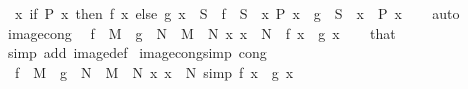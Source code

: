 \begin{isabellebody}
\ \ {\isachardoublequoteopen}{\isacharparenleft}{\kern0pt}{\isasymlambda}x{\isachardot}{\kern0pt}\ if\ P\ x\ then\ f\ x\ else\ g\ x{\isacharparenright}{\kern0pt}\ {\isacharbackquote}{\kern0pt}\ S\ {\isacharequal}{\kern0pt}\ f\ {\isacharbackquote}{\kern0pt}\ {\isacharparenleft}{\kern0pt}S\ {\isasyminter}\ {\isacharbraceleft}{\kern0pt}x{\isachardot}{\kern0pt}\ P\ x{\isacharbraceright}{\kern0pt}{\isacharparenright}{\kern0pt}\ {\isasymunion}\ g\ {\isacharbackquote}{\kern0pt}\ {\isacharparenleft}{\kern0pt}S\ {\isasyminter}\ {\isacharbraceleft}{\kern0pt}x{\isachardot}{\kern0pt}\ {\isasymnot}\ P\ x{\isacharbraceright}{\kern0pt}{\isacharparenright}{\kern0pt}{\isachardoublequoteclose}\isanewline
%
\isadelimproof
\ \ %
\endisadelimproof
%
\isatagproof
{}\isamarkupfalse%
\ auto%
\endisatagproof
{\isafoldproof}%
%
\isadelimproof
\isanewline
%
\endisadelimproof
\isanewline
{}\isamarkupfalse%
\ image{\isacharunderscore}{\kern0pt}cong{\isacharcolon}{\kern0pt}\isanewline
\ \ {\isachardoublequoteopen}f\ {\isacharbackquote}{\kern0pt}\ M\ {\isacharequal}{\kern0pt}\ g\ {\isacharbackquote}{\kern0pt}\ N{\isachardoublequoteclose}\ \ {\isachardoublequoteopen}M\ {\isacharequal}{\kern0pt}\ N{\isachardoublequoteclose}\ {\isachardoublequoteopen}{\isasymAnd}x{\isachardot}{\kern0pt}\ x\ {\isasymin}\ N\ {\isasymLongrightarrow}\ f\ x\ {\isacharequal}{\kern0pt}\ g\ x{\isachardoublequoteclose}\isanewline
%
\isadelimproof
\ \ %
\endisadelimproof
%
\isatagproof
{}\isamarkupfalse%
\ that\ \isamarkupfalse%
\ {\isacharparenleft}{\kern0pt}simp\ add{\isacharcolon}{\kern0pt}\ image{\isacharunderscore}{\kern0pt}def{\isacharparenright}{\kern0pt}%
\endisatagproof
{\isafoldproof}%
%
\isadelimproof
\isanewline
%
\endisadelimproof
\isanewline
{}\isamarkupfalse%
\ image{\isacharunderscore}{\kern0pt}cong{\isacharunderscore}{\kern0pt}simp\ {\isacharbrackleft}{\kern0pt}cong{\isacharbrackright}{\kern0pt}{\isacharcolon}{\kern0pt}\isanewline
\ \ {\isachardoublequoteopen}f\ {\isacharbackquote}{\kern0pt}\ M\ {\isacharequal}{\kern0pt}\ g\ {\isacharbackquote}{\kern0pt}\ N{\isachardoublequoteclose}\ \ {\isachardoublequoteopen}M\ {\isacharequal}{\kern0pt}\ N{\isachardoublequoteclose}\ {\isachardoublequoteopen}{\isasymAnd}x{\isachardot}{\kern0pt}\ x\ {\isasymin}\ N\ {\isacharequal}{\kern0pt}simp{\isacharequal}{\kern0pt}{\isachargreater}{\kern0pt}\ f\ x\ {\isacharequal}{\kern0pt}\ g\ x{\isachardoublequoteclose}\isanewline
%
\isadelimproof
\ \ %
\endisadelimproof
%
\isatagproof
{}\isamarkupfalse%

\end{isabellebody}
